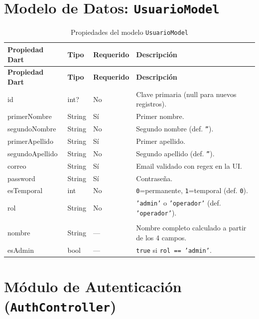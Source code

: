 \documentclass[12pt,a4paper]{article}
\begin{document}
\section{Modelo de Datos: \texttt{UsuarioModel}}

\begin{longtable}{>{\ttfamily}p{4cm} p{2.5cm} p{3cm} p{4cm}}
\caption{Propiedades del modelo \texttt{UsuarioModel}} \label{tab:usuario-model} \\
\toprule
\textbf{Propiedad Dart} & \textbf{Tipo} & \textbf{Requerido} & \textbf{Descripción} \\
\midrule
\endfirsthead
\toprule
\textbf{Propiedad Dart} & \textbf{Tipo} & \textbf{Requerido} & \textbf{Descripción} \\
\midrule
\endhead
\bottomrule
\endlastfoot
id              & int?   & No  & Clave primaria (null para nuevos registros). \\
primerNombre    & String & Sí  & Primer nombre. \\
segundoNombre   & String & No  & Segundo nombre (def. \texttt{''}). \\
primerApellido  & String & Sí  & Primer apellido. \\
segundoApellido & String & No  & Segundo apellido (def. \texttt{''}). \\
correo          & String & Sí  & Email validado con regex en la UI. \\
password        & String & Sí  & Contraseña. \\
esTemporal      & int    & No  & \texttt{0}=permanente, \texttt{1}=temporal (def. \texttt{0}). \\
rol             & String & No  & \texttt{'admin'} o \texttt{'operador'} (def. \texttt{'operador'}). \\
\midrule
\multicolumn{4}{l}{\textbf{Getters calculados:}} \\
\midrule
nombre  & String & --- & Nombre completo calculado a partir de los 4 campos. \\
esAdmin & bool   & --- & \texttt{true} si \texttt{rol == 'admin'}. \\
\end{longtable}

\section{Módulo de Autenticación (\texttt{AuthController})}
\end{document}
